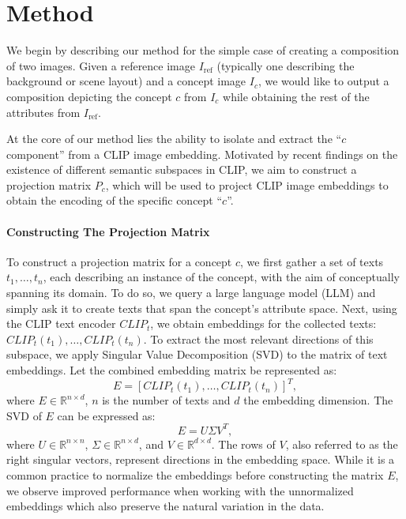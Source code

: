 \section{Method}
We begin by describing our method for the simple case of creating a composition of two images.
Given a reference image \( I_{\text{ref}} \) (typically one describing the background or scene layout) and a concept image \( I_c \), we would like to output a composition depicting the concept \( c \) from \( I_c \) while obtaining the rest of the attributes from \( I_{\text{ref}} \). 

At the core of our method lies the ability to isolate and extract the ``$c$ component'' from a CLIP image embedding. Motivated by recent findings on the existence of different semantic subspaces in CLIP, we aim to construct a projection matrix \( P_c \), which will be used to project CLIP image embeddings to obtain the encoding of the specific concept ``$c$''.

\paragraph{\textbf{Constructing The Projection Matrix}} To construct a projection matrix for a concept $c$, we first gather a set of texts $t_1, \dots, t_n$, each describing an instance of the concept, with the aim of conceptually spanning its domain. To do so, we query a large language model (LLM) and simply ask it to create texts that span the concept's attribute space.
Next, using the CLIP text encoder \( CLIP_t \), we obtain embeddings for the collected texts: \( CLIP_t(t_1), \dots, CLIP_t(t_n) \). To extract the most relevant directions of this subspace, we apply Singular Value Decomposition (SVD) to the matrix of text embeddings. Let the combined embedding matrix be represented as:
\begin{equation}
E = \left[CLIP_t(t_1), \dots, CLIP_t(t_n)\right]^T,
\end{equation}
where \( E \in \mathbb{R}^{n \times d} \), \( n \) is the number of texts and \( d \) the embedding dimension. The SVD of \( E \) can be expressed as:
\begin{equation}
E = U \Sigma V^T,
\end{equation}
where \( U \in \mathbb{R}^{n \times n} \), \( \Sigma \in \mathbb{R}^{n \times d} \), and \( V \in \mathbb{R}^{d \times d} \). The rows of \( V \), also referred to as the right singular vectors, represent directions in the embedding space. While it is a common practice to normalize the embeddings before constructing the matrix \( E \), we observe improved performance when working with the unnormalized embeddings which also preserve the natural variation in the data.


